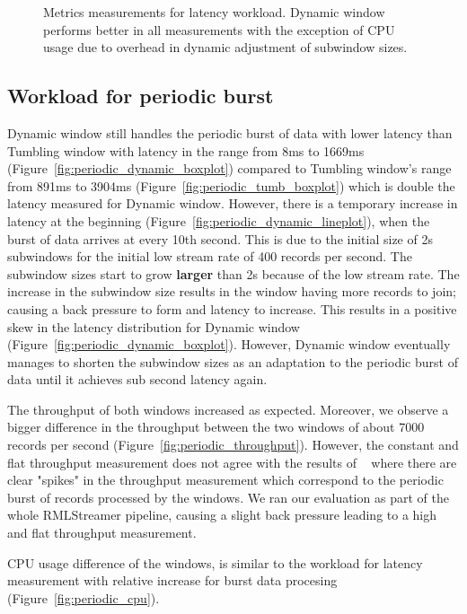 \begin{figure}[htbp]
    \caption[Metrics measurements for latency workload.]
    {Metrics measurements for latency workload. Dynamic window performs 
    better in all measurements with the exception of CPU usage due to
overhead in dynamic adjustment of subwindow sizes.}%
    \label{fig:constant_measurement}
\end{figure}

\subsection{Workload for periodic burst}%
\label{sec:Results Workload for periodic burst}

Dynamic window still handles the periodic burst of data with lower latency 
than Tumbling window with latency in the range from 8ms to 1669ms
(Figure~\ref{fig:periodic_dynamic_boxplot}) compared to 
Tumbling window's range from 891ms to 3904ms 
(Figure~\ref{fig:periodic_tumb_boxplot}) which is double the latency 
measured for Dynamic window.
However, there is a temporary increase in latency at the beginning 
(Figure~\ref{fig:periodic_dynamic_lineplot}), 
when the burst of data arrives at every 10th second. 
This is due to the initial size of 2s subwindows for the initial low stream rate of 400 records per second. 
The subwindow sizes start to grow \textbf{larger} than 2s because of the low stream rate. 
The increase in the subwindow size results in the 
window having more records to join; causing a back pressure to form and latency to increase.  
This results in a positive skew in the latency distribution for Dynamic window (Figure~\ref{fig:periodic_dynamic_boxplot}). 
However, Dynamic window eventually manages to shorten the subwindow sizes as an
adaptation to the periodic burst of data until it achieves sub second latency again.


The throughput of both windows increased as expected.
Moreover, we observe a bigger difference in the throughput between the 
two windows of about 7000 records per second 
(Figure~\ref{fig:periodic_throughput}). However, the
constant and flat throughput measurement does not agree 
with the results of ~\cite{evalution_of_spe} where there are clear "spikes" in 
the throughput measurement which correspond to the periodic burst 
of records processed by the windows. 
We ran our evaluation as part of the whole RMLStreamer pipeline, causing 
a slight back pressure 
leading to a high and flat throughput measurement. 

CPU usage difference of the windows, is similar to the 
workload for latency measurement with relative increase for 
burst data procesing
(Figure~\ref{fig:periodic_cpu}). 

